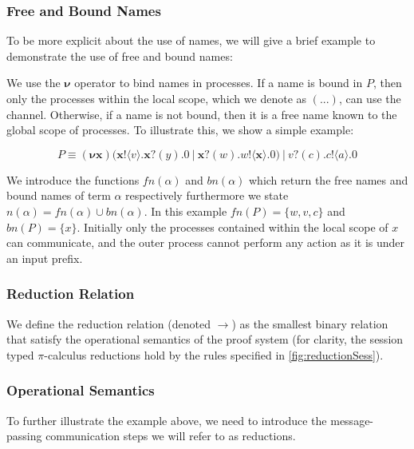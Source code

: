 \subsubsection{Free and Bound Names} 
To be more explicit about the use of names, we will give a brief example to demonstrate the use of free and bound names:

We use the $\boldsymbol \nu$ operator to bind names in processes. If a name is bound in $P$, then only the processes within the local scope, which we denote as $(...)$, can use the channel. Otherwise, if a name is not bound, then it is a free name known to the global scope of processes. To illustrate this, we show a simple example:

\begin{equation*}
    P \equiv \boldsymbol{(\nu x)} (\boldsymbol{x}!\langle v \rangle.\boldsymbol{x}?(y).0 \:|\: \boldsymbol{x}?(w).w!\langle \boldsymbol{x} \rangle.0) \:|\: v?(c).c!\langle a \rangle.0
\end{equation*}

We introduce the functions $fn(\alpha)$ and $bn(\alpha)$ which return the free names and bound names of term $\alpha$ respectively furthermore we state $n(\alpha) = fn(\alpha) \cup bn(\alpha)$. In this example $fn(P) = \{w, v, c\}$ and $bn(P) = \{x\}$. Initially only the processes contained within the local scope of $x$ can communicate, and the outer process cannot perform any action as it is under an input prefix. 


\subsubsection{Reduction Relation}
We define the reduction relation (denoted $\boldsymbol{\rightarrow}$) \cite{cantini1996logical} as the smallest binary relation that satisfy the operational semantics of the proof system (for clarity, the session typed $\pi$-calculus reductions hold by the rules specified in \autoref{fig:reductionSess}). 


\subsubsection{Operational Semantics}

To further illustrate the example above, we need to introduce the message-passing communication steps we will refer to as reductions.

